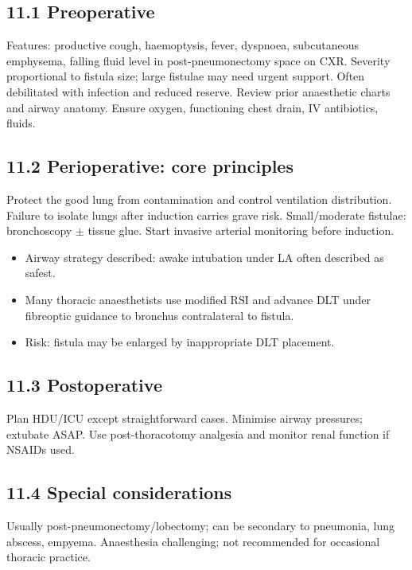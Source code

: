 \documentclass[11pt,a4paper]{article}
\begin{document}
\subsection{11.1 Preoperative}
Features: productive cough, haemoptysis, fever, dyspnoea, subcutaneous emphysema, falling fluid level in post-pneumonectomy space on CXR. Severity proportional to fistula size; large fistulae may need urgent support. Often debilitated with infection and reduced reserve. Review prior anaesthetic charts and airway anatomy. Ensure oxygen, functioning chest drain, IV antibiotics, fluids.

\subsection{11.2 Perioperative: core principles}
Protect the good lung from contamination and control ventilation distribution. Failure to isolate lungs after induction carries grave risk. Small/moderate fistulae: bronchoscopy \(\pm\) tissue glue. Start invasive arterial monitoring before induction.
\begin{itemize}[leftmargin=*, itemsep=2pt]
  \item Airway strategy described: awake intubation under LA often described as safest.
  \item Many thoracic anaesthetists use modified RSI and advance DLT under fibreoptic guidance to bronchus contralateral to fistula.
  \item Risk: fistula may be enlarged by inappropriate DLT placement.
\end{itemize}

\subsection{11.3 Postoperative}
Plan HDU/ICU except straightforward cases. Minimise airway pressures; extubate ASAP. Use post-thoracotomy analgesia and monitor renal function if NSAIDs used.

\subsection{11.4 Special considerations}
Usually post-pneumonectomy/lobectomy; can be secondary to pneumonia, lung abscess, empyema. Anaesthesia challenging; not recommended for occasional thoracic practice.
\end{document}
